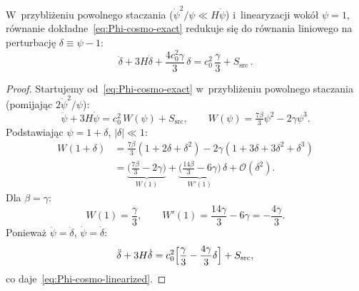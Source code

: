 \medskip
\begin{proposition}%
\label{prop:exact-to-linearized}
W~przybli\.zeniu powolnego staczania
($\dot\psi^2/\psi \ll H\dot\psi$) i~linearyzacji
wok\'o\l{} $\psi = 1$, r\'ownanie
dok\l{}adne~\eqref{eq:Phi-cosmo-exact} redukuje si\k{e} do
r\'ownania liniowego na perturbacj\k{e} $\delta \equiv \psi - 1$:
\begin{equation}\label{eq:Phi-cosmo-linearized}
  \boxed{
    \ddot\delta + 3H\dot\delta
    + \frac{4c_0^2\gamma}{3}\,\delta
    = c_0^2\,\frac{\gamma}{3}
    + S_{\mathrm{src}}\,.
  }
\end{equation}
\end{proposition}

\begin{proof}
Startujemy od~\eqref{eq:Phi-cosmo-exact} w~przybli\.zeniu
powolnego staczania (pomijaj\k{a}c $2\dot\psi^2/\psi$):
\[
  \ddot\psi + 3H\dot\psi
  = c_0^2\,W(\psi) + S_{\mathrm{src}},
  \qquad
  W(\psi) = \tfrac{7\beta}{3}\psi^2 - 2\gamma\psi^3.
\]
Podstawiaj\k{a}c $\psi = 1 + \delta$, $|\delta| \ll 1$:
\begin{align}
  W(1+\delta)
  &= \tfrac{7\beta}{3}(1+2\delta+\delta^2)
     - 2\gamma(1+3\delta+3\delta^2+\delta^3) \nonumber\\
  &= \underbrace{\bigl(\tfrac{7\beta}{3}-2\gamma\bigr)}_{W(1)}
     + \underbrace{\bigl(\tfrac{14\beta}{3}-6\gamma\bigr)}_{W'(1)}\,\delta
     + \mathcal{O}(\delta^2). \label{eq:W-expansion}
\end{align}
Dla $\beta = \gamma$:
\[
  W(1) = \frac{\gamma}{3}, \qquad
  W'(1) = \frac{14\gamma}{3} - 6\gamma = -\frac{4\gamma}{3}.
\]
Poniewa\.z $\ddot\psi = \ddot\delta$, $\dot\psi = \dot\delta$:
\[
  \ddot\delta + 3H\dot\delta
  = c_0^2\Bigl[\frac{\gamma}{3} - \frac{4\gamma}{3}\delta\Bigr]
  + S_{\mathrm{src}},
\]
co daje~\eqref{eq:Phi-cosmo-linearized}.
\end{proof}

